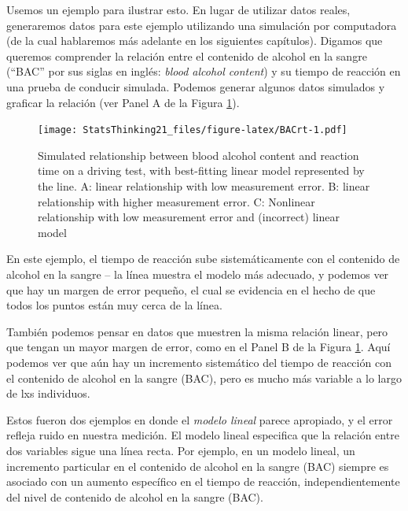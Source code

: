 \documentclass[
  12pt,
]{book}
\begin{document}
Usemos un ejemplo para ilustrar esto. En lugar de utilizar datos reales, generaremos datos para este ejemplo utilizando una simulación por computadora (de la cual hablaremos más adelante en los siguientes capítulos). Digamos que queremos comprender la relación entre el contenido de alcohol en la sangre (``BAC'' por sus siglas en inglés: \emph{blood alcohol content}) y su tiempo de reacción en una prueba de conducir simulada. Podemos generar algunos datos simulados y graficar la relación (ver Panel A de la Figura \ref{fig:BACrt}).

\begin{figure}
\centering
\texttt{[image: StatsThinking21\_files/figure-latex/BACrt-1.pdf]}
\caption{\label{fig:BACrt}Simulated relationship between blood alcohol content and reaction time on a driving test, with best-fitting linear model represented by the line. A: linear relationship with low measurement error. B: linear relationship with higher measurement error. C: Nonlinear relationship with low measurement error and (incorrect) linear model}
\end{figure}

En este ejemplo, el tiempo de reacción sube sistemáticamente con el contenido de alcohol en la sangre -- la línea muestra el modelo más adecuado, y podemos ver que hay un margen de error pequeño, el cual se evidencia en el hecho de que todos los puntos están muy cerca de la línea.

También podemos pensar en datos que muestren la misma relación linear, pero que tengan un mayor margen de error, como en el Panel B de la Figura \ref{fig:BACrt}. Aquí podemos ver que aún hay un incremento sistemático del tiempo de reacción con el contenido de alcohol en la sangre (BAC), pero es mucho más variable a lo largo de lxs individuos.

Estos fueron dos ejemplos en donde el \emph{modelo lineal} parece apropiado, y el error refleja ruido en nuestra medición. El modelo lineal especifica que la relación entre dos variables sigue una línea recta. Por ejemplo, en un modelo lineal, un incremento particular en el contenido de alcohol en la sangre (BAC) siempre es asociado con un aumento específico en el tiempo de reacción, independientemente del nivel de contenido de alcohol en la sangre (BAC).
\end{document}
